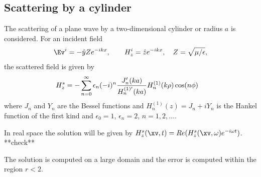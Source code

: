 \subsection{Scattering by a cylinder}

The scattering of a plane wave by a two-dimensional cylinder or radius $a$ is considered.
For an incident field 
\[
     \Ev^i = -\hat{y} Z e^{-ikx}, \qquad   H_z^i = \hat{z} e^{-ikx}, \quad Z=\sqrt{\mu/\eps},
\] 
the scattered field is given by
\begin{align*}
  H_z^s &= - \sum_{n=0}^\infty \epsilon_n (-i)^n { J_n'(ka) \over H_n^{(1)'}(ka)} H_n^{(1)}(k\rho) \cos( n \phi )
\end{align*}
where $J_n$ and $Y_n$ are the Bessel functions and $H_n^{(1)}(z)= J_n + i Y_n $ is the Hankel function
of the first kind and $\epsilon_0=1$, $\epsilon_n=2$, $n=1,2,\ldots$.

In real space the solution will be given by $H_z^s(\xv,t) = Re(H_z^s(\xv,\omega) e^{-i\omega t})$. **check**



The solution is computed on a large domain and the error is computed within the region $r<2$.



